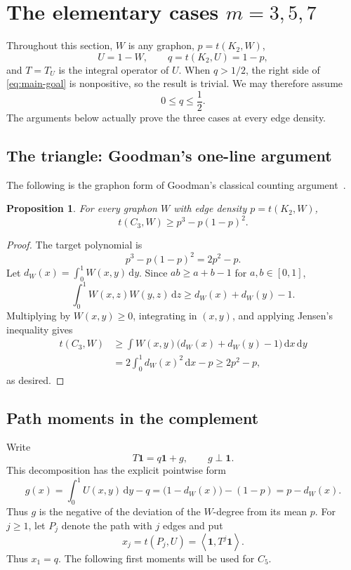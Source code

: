 \documentclass[11pt]{article}
\newtheorem{proposition}[theorem]{Proposition}
\newcommand{\one}{\mathbf 1}
\newcommand{\ip}[2]{\left\langle #1,#2\right\rangle}
\newcommand{\dd}{\,\mathrm d}
\begin{document}
\section{The elementary cases \texorpdfstring{\(m=3,5,7\)}{m=3,5,7}}\label{sec:short-cycles}

Throughout this section, \(W\) is any graphon, \(p=t(K_2,W)\),
\[
       U=1-W,\qquad q=t(K_2,U)=1-p,
\]
and \(T=T_U\) is the integral operator of \(U\).  When \(q>1/2\), the
right side of \eqref{eq:main-goal} is nonpositive, so the result is trivial.
We may therefore assume
\begin{equation}\label{eq:q-short}
       0\le q\le\frac12.
\end{equation}
The arguments below actually prove the three cases at every edge density.

\subsection{The triangle: Goodman's one-line argument}\label{subsec:C3}

The following is the graphon form of Goodman's classical counting
argument~\cite{Goodman1959}.

\begin{proposition}\label{prop:C3}
For every graphon \(W\) with edge density \(p=t(K_2,W)\),
\[
       t(C_3,W)\ge p^3-p(1-p)^2.
\]
\end{proposition}

\begin{proof}
The target polynomial is
\[
       p^3-p(1-p)^2=2p^2-p.
\]
Let \(d_W(x)=\int_0^1W(x,y)\dd y\).  Since
\(ab\ge a+b-1\) for \(a,b\in[0,1]\),
\[
 \int_0^1W(x,z)W(y,z)\dd z\ge d_W(x)+d_W(y)-1.
\]
Multiplying by \(W(x,y)\ge0\), integrating in \((x,y)\), and applying
Jensen's inequality gives
\[
\begin{aligned}
 t(C_3,W)
 &\ge \int W(x,y)\bigl(d_W(x)+d_W(y)-1\bigr)\dd x\dd y\\
 &=2\int_0^1d_W(x)^2\dd x-p
 \ge2p^2-p,
\end{aligned}
\]
as desired.
\end{proof}

\subsection{Path moments in the complement}\label{subsec:path-moments}

Write
\begin{equation}\label{eq:T1-decomp}
       T\one=q\one+g,
       \qquad g\perp\one.
\end{equation}
This decomposition has the explicit pointwise form
\[
 g(x)=\int_0^1U(x,y)\dd y-q
     =\bigl(1-d_W(x)\bigr)-(1-p)
     =p-d_W(x).
\]
Thus \(g\) is the negative of the deviation of the \(W\)-degree from its
mean \(p\).
For \(j\ge1\), let \(P_j\) denote the path with \(j\) edges and put
\[
       x_j=t(P_j,U)=\ip{\one}{T^j\one}.
\]
Thus \(x_1=q\).  The following first moments will be used for \(C_5\).
\end{document}
